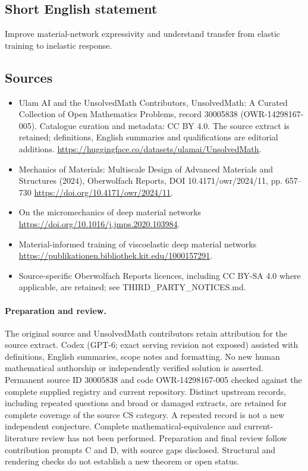 \documentclass[11pt]{article}
\begin{document}
\subsection{Short English statement}
Improve material-network expressivity and understand transfer from elastic training to inelastic response.
\subsection{Sources}
\begin{itemize}
\item[\hypertarget{source:30005838:1}{S1}] Ulam AI and the UnsolvedMath Contributors, UnsolvedMath: A Curated Collection of Open Mathematics Problems, record 30005838 (OWR-14298167-005). Catalogue curation and metadata: CC BY 4.0. The source extract is retained; definitions, English summaries and qualifications are editorial additions.
\url{https://huggingface.co/datasets/ulamai/UnsolvedMath}.
\item[\hypertarget{source:30005838:2}{S2}] Mechanics of Materials: Multiscale Design of Advanced Materials and Structures (2024), Oberwolfach Reports, DOI 10.4171/owr/2024/11, pp. 657--730
\url{https://doi.org/10.4171/owr/2024/11}.
\item[\hypertarget{source:30005838:3}{S3}] On the micromechanics of deep material networks
\url{https://doi.org/10.1016/j.jmps.2020.103984}.
\item[\hypertarget{source:30005838:4}{S4}] Material-informed training of viscoelastic deep material networks
\url{https://publikationen.bibliothek.kit.edu/1000157291}.
\item Source-specific Oberwolfach Reports licences, including CC BY-SA 4.0 where applicable, are retained; see THIRD\_PARTY\_NOTICES.md.
\end{itemize}
\paragraph{Preparation and review.}
The original source and UnsolvedMath contributors retain attribution for the source extract. Codex (GPT-6; exact serving revision not exposed) assisted with definitions, English summaries, scope notes and formatting. No new human mathematical authorship or independently verified solution is asserted. Permanent source ID 30005838 and code OWR-14298167-005 checked against the complete supplied registry and current repository. Distinct upstream records, including repeated questions and broad or damaged extracts, are retained for complete coverage of the source CS category. A repeated record is not a new independent conjecture. Complete mathematical-equivalence and current-literature review has not been performed. Preparation and final review follow contribution prompts C and D, with source gaps disclosed. Structural and rendering checks do not establish a new theorem or open status.
\label{end:30005838}
\end{document}
